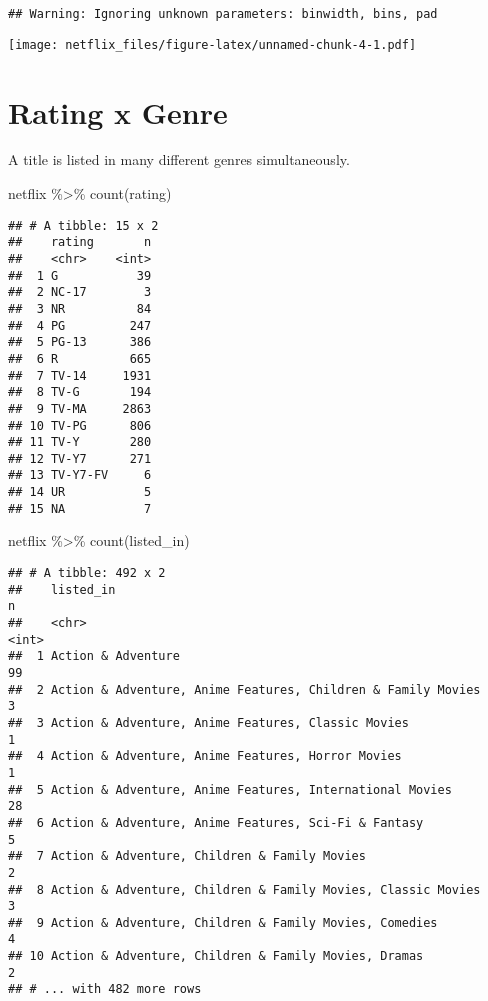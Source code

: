 \documentclass[
]{article}
\newenvironment{Shaded}{\begin{snugshade}}{\end{snugshade}}
\newcommand{\FunctionTok}[1]{\textcolor[rgb]{0.00,0.00,0.00}{#1}}
\newcommand{\NormalTok}[1]{#1}
\newcommand{\SpecialCharTok}[1]{\textcolor[rgb]{0.00,0.00,0.00}{#1}}
\begin{document}
\begin{verbatim}
## Warning: Ignoring unknown parameters: binwidth, bins, pad
\end{verbatim}

\texttt{[image: netflix\_files/figure-latex/unnamed-chunk-4-1.pdf]}

\hypertarget{rating-x-genre}{%
\section{Rating x Genre}\label{rating-x-genre}}

A title is listed in many different genres simultaneously.

\begin{Shaded}
\begin{Highlighting}[]
\NormalTok{netflix }\SpecialCharTok{\%\textgreater{}\%} \FunctionTok{count}\NormalTok{(rating)}
\end{Highlighting}
\end{Shaded}

\begin{verbatim}
## # A tibble: 15 x 2
##    rating       n
##    <chr>    <int>
##  1 G           39
##  2 NC-17        3
##  3 NR          84
##  4 PG         247
##  5 PG-13      386
##  6 R          665
##  7 TV-14     1931
##  8 TV-G       194
##  9 TV-MA     2863
## 10 TV-PG      806
## 11 TV-Y       280
## 12 TV-Y7      271
## 13 TV-Y7-FV     6
## 14 UR           5
## 15 NA           7
\end{verbatim}

\begin{Shaded}
\begin{Highlighting}[]
\NormalTok{netflix }\SpecialCharTok{\%\textgreater{}\%} \FunctionTok{count}\NormalTok{(listed\_in)}
\end{Highlighting}
\end{Shaded}

\begin{verbatim}
## # A tibble: 492 x 2
##    listed_in                                                        n
##    <chr>                                                        <int>
##  1 Action & Adventure                                              99
##  2 Action & Adventure, Anime Features, Children & Family Movies     3
##  3 Action & Adventure, Anime Features, Classic Movies               1
##  4 Action & Adventure, Anime Features, Horror Movies                1
##  5 Action & Adventure, Anime Features, International Movies        28
##  6 Action & Adventure, Anime Features, Sci-Fi & Fantasy             5
##  7 Action & Adventure, Children & Family Movies                     2
##  8 Action & Adventure, Children & Family Movies, Classic Movies     3
##  9 Action & Adventure, Children & Family Movies, Comedies           4
## 10 Action & Adventure, Children & Family Movies, Dramas             2
## # ... with 482 more rows
\end{verbatim}
\end{document}
